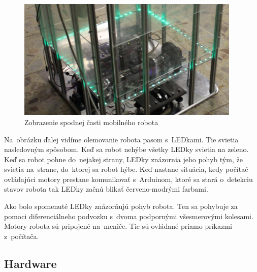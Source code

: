 \begin{figure}[!htbp]
	\begin{center}
		\includegraphics[width=0.95\textwidth]{img/robot.png}
	\end{center}
	\caption{Zobrazenie spodnej časti mobilného robota~\cite{timovyProjekt}}
	\label{fig:robot}
\end{figure}

\noindent Na~obrázku ďalej vidíme olemovanie robota pasom s~LEDkami. Tie svietia nasledovným spôsobom. Keď sa robot nehýbe všetky LEDky svietia
na zeleno. Keď sa robot pohne do~nejakej strany, LEDky znázornia jeho pohyb tým, že svietia na~strane, do~ktorej sa robot hýbe. Keď nastane
situácia, kedy počítač ovládajúci motory prestane komunikovať s~Arduinom, ktoré sa stará o~detekciu stavov robota tak LEDky začnú blikať červeno-modrými farbami.

Ako bolo spomenuté LEDky znázorňujú pohyb robota. Ten sa pohybuje za pomoci diferenciálneho podvozku s~dvoma podpornými všesmerovými kolesami. Motory robota
sú pripojené na~meniče. Tie sú ovládané priamo príkazmi z~počítača.

\subsection{Hardware}

